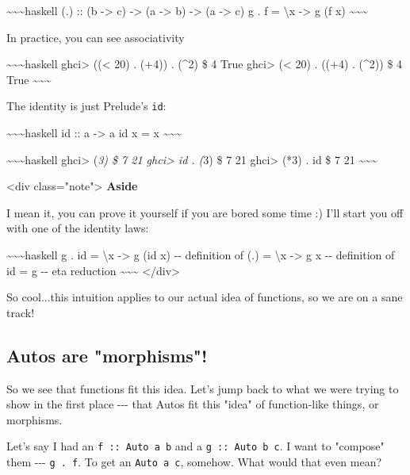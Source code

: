 \documentclass[]{article}
\begin{document}
\textasciitilde{}\textasciitilde{}\textasciitilde{}haskell (.) :: (b
-\textgreater{} c) -\textgreater{} (a -\textgreater{} b) -\textgreater{} (a
-\textgreater{} c) g . f = \textbackslash{}x -\textgreater{} g (f x)
\textasciitilde{}\textasciitilde{}\textasciitilde{}

In practice, you can see associativity

\textasciitilde{}\textasciitilde{}\textasciitilde{}haskell ghci\textgreater{}
((\textless{} 20) . (+4)) . (\^{}2) \$ 4 True ghci\textgreater{} (\textless{}
20) . ((+4) . (\^{}2)) \$ 4 True
\textasciitilde{}\textasciitilde{}\textasciitilde{}

The identity is just Prelude's \texttt{id}:

\textasciitilde{}\textasciitilde{}\textasciitilde{}haskell id :: a
-\textgreater{} a id x = x \textasciitilde{}\textasciitilde{}\textasciitilde{}

\textasciitilde{}\textasciitilde{}\textasciitilde{}haskell ghci\textgreater{}
(\emph{3) \$ 7 21 ghci\textgreater{} id . (}3) \$ 7 21 ghci\textgreater{} (*3) .
id \$ 7 21 \textasciitilde{}\textasciitilde{}\textasciitilde{}

\textless{}div class="note"\textgreater{} \textbf{Aside}

I mean it, you can prove it yourself if you are bored some time :) I'll start
you off with one of the identity laws:

\textasciitilde{}\textasciitilde{}\textasciitilde{}haskell g . id =
\textbackslash{}x -\textgreater{} g (id x) -\/- definition of (.) =
\textbackslash{}x -\textgreater{} g x -\/- definition of id = g -\/- eta
reduction \textasciitilde{}\textasciitilde{}\textasciitilde{}
\textless{}/div\textgreater{}

So cool...this intuition applies to our actual idea of functions, so we are on a
sane track!

\subsection{Autos are "morphisms"!}

So we see that functions fit this idea. Let's jump back to what we were trying
to show in the first place -\/-\/- that Autos fit this "idea" of function-like
things, or morphisms.

Let's say I had an \texttt{f\ ::\ Auto\ a\ b} and a \texttt{g\ ::\ Auto\ b\ c}.
I want to "compose" them -\/-\/- \texttt{g\ .\ f}. To get an
\texttt{Auto\ a\ c}, somehow. What would that even mean?
\end{document}
